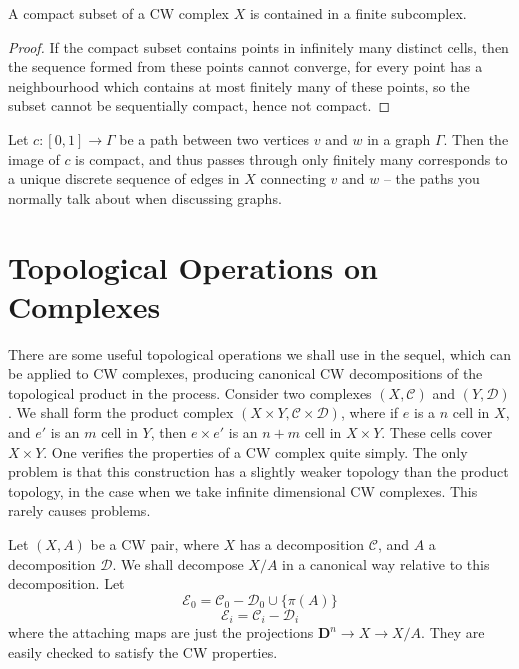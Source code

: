 \begin{theorem}
    A compact subset of a CW complex $X$ is contained in a finite subcomplex.
\end{theorem}
\begin{proof}
    If the compact subset contains points in infinitely many distinct cells, then the sequence formed from these points cannot converge, for every point has a neighbourhood which contains at most  finitely many of these points, so the subset cannot be sequentially compact, hence not compact.
\end{proof}

\begin{example}
    Let $c:[0,1] \to \Gamma$ be a path between two vertices $v$ and $w$ in a graph $\Gamma$. Then the image of $c$ is compact, and thus passes through only finitely many corresponds to a unique discrete sequence of edges in $X$ connecting $v$ and $w$ -- the paths you normally talk about when discussing graphs.
\end{example}

\section{Topological Operations on Complexes}

There are some useful topological operations we shall use in the sequel, which can be applied to CW complexes, producing canonical CW decompositions of the topological product in the process. Consider two complexes $(X,\mathcal{C})$ and $(Y,\mathcal{D})$. We shall form the product complex $(X \times Y, \mathcal{C} \times \mathcal{D})$, where if $e$ is a $n$ cell in $X$, and $e'$ is an $m$ cell in $Y$, then $e \times e'$ is an $n + m$ cell in $X \times Y$. These cells cover $X \times Y$. One verifies the properties of a CW complex quite simply. The only problem is that this construction has a slightly weaker topology than the product topology, in the case when we take infinite dimensional CW complexes. This rarely causes problems.

Let $(X,A)$ be a CW pair, where $X$ has a decomposition $\mathcal{C}$, and $A$ a decomposition $\mathcal{D}$. We shall decompose $X/A$ in a canonical way relative to this decomposition. Let
%
\[ \mathcal{E}_0 = \mathcal{C}_0 - \mathcal{D}_0 \cup \{ \pi(A) \} \]
\[ \mathcal{E}_i = \mathcal{C}_i - \mathcal{D}_i \]
%
where the attaching maps are just the projections $\mathbf{D}^n \to X \to X/A$. They are easily checked to satisfy the CW properties.

